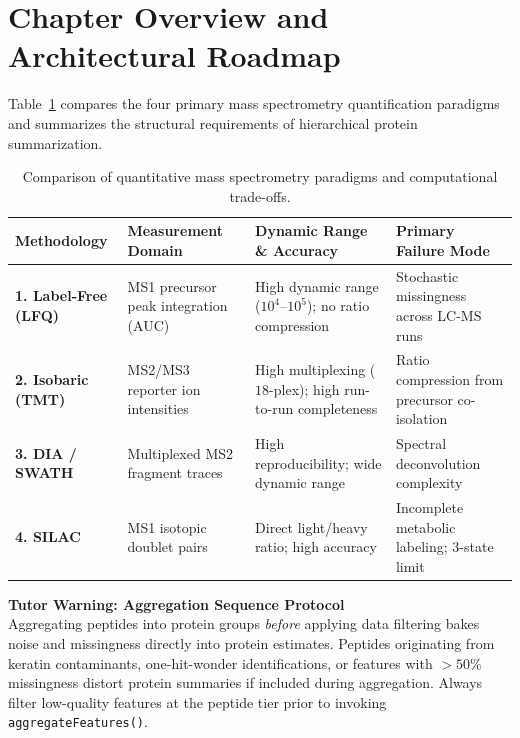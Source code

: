 \documentclass[11pt,twoside,openright]{book}
\begin{document}
\vspace{1em}
\section*{Chapter Overview and Architectural Roadmap}

Table~\ref{tab:quant_roadmap} compares the four primary mass spectrometry quantification paradigms and summarizes the structural requirements of hierarchical protein summarization.

\begin{table}[htbp]
\centering
\caption{Comparison of quantitative mass spectrometry paradigms and computational trade-offs.}
\label{tab:quant_roadmap}
\small
\begin{tabularx}{\textwidth}{>{\raggedright\arraybackslash}l >{\raggedright\arraybackslash}p{3.2cm} >{\raggedright\arraybackslash}X >{\raggedright\arraybackslash}p{2.8cm}}
\toprule
\textbf{Methodology} & \textbf{Measurement Domain} & \textbf{Dynamic Range \& Accuracy} & \textbf{Primary Failure Mode} \\
\midrule
\textbf{1. Label-Free (LFQ)} & MS1 precursor peak integration (AUC) \cite{cox2014maxlfq} & High dynamic range ($10^4$--$10^5$); no ratio compression & Stochastic missingness across LC-MS runs \\
\addlinespace
\textbf{2. Isobaric (TMT)} & MS2/MS3 reporter ion intensities \cite{ting2011sps, savitski2013tmt} & High multiplexing ($18$-plex); high run-to-run completeness & Ratio compression from precursor co-isolation \\
\addlinespace
\textbf{3. DIA / SWATH} & Multiplexed MS2 fragment traces \cite{gillet2012targeted, bruderer2015extending} & High reproducibility; wide dynamic range & Spectral deconvolution complexity \\
\addlinespace
\textbf{4. SILAC} & MS1 isotopic doublet pairs \cite{ong2002stable} & Direct light/heavy ratio; high accuracy & Incomplete metabolic labeling; $3$-state limit \\
\bottomrule
\end{tabularx}
\end{table}

\begin{notebox}
\textbf{Tutor Warning: Aggregation Sequence Protocol}\\[0.4em]
Aggregating peptides into protein groups \emph{before} applying data filtering bakes noise and missingness directly into protein estimates. Peptides originating from keratin contaminants, one-hit-wonder identifications, or features with $>50\%$ missingness distort protein summaries if included during aggregation. Always filter low-quality features at the peptide tier prior to invoking \texttt{aggregateFeatures()}.
\end{notebox}
\end{document}
